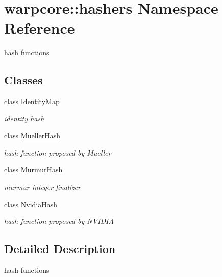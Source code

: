\hypertarget{namespacewarpcore_1_1hashers}{}\section{warpcore\+:\+:hashers Namespace Reference}
\label{namespacewarpcore_1_1hashers}


hash functions  


\subsection*{Classes}
\begin{DoxyCompactItemize}
\item 
class \hyperlink{classwarpcore_1_1hashers_1_1IdentityMap}{Identity\+Map}
\begin{DoxyCompactList}\small\item\em identity hash \end{DoxyCompactList}\item 
class \hyperlink{classwarpcore_1_1hashers_1_1MuellerHash}{Mueller\+Hash}
\begin{DoxyCompactList}\small\item\em hash function proposed by Mueller \end{DoxyCompactList}\item 
class \hyperlink{classwarpcore_1_1hashers_1_1MurmurHash}{Murmur\+Hash}
\begin{DoxyCompactList}\small\item\em murmur integer finalizer \end{DoxyCompactList}\item 
class \hyperlink{classwarpcore_1_1hashers_1_1NvidiaHash}{Nvidia\+Hash}
\begin{DoxyCompactList}\small\item\em hash function proposed by N\+V\+I\+D\+IA \end{DoxyCompactList}\end{DoxyCompactItemize}


\subsection{Detailed Description}
hash functions 